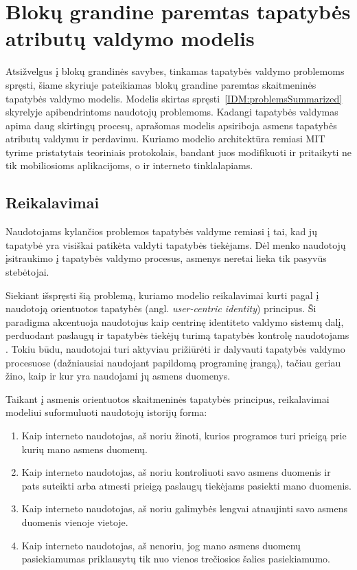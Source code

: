 \section{Blokų grandine paremtas tapatybės atributų valdymo modelis} \label{section:BCIDM}

Atsižvelgus į blokų grandinės savybes, tinkamas tapatybės valdymo problemoms spręsti, šiame skyriuje pateikiamas
blokų grandine paremtas skaitmeninės tapatybės valdymo modelis. Modelis skirtas spręsti\hypertarget{IDM:problemsSummarized}{~\ref{IDM:problemsSummarized}} skyrelyje
apibendrintoms naudotojų problemoms. Kadangi tapatybės valdymas apima
daug skirtingų procesų, aprašomas modelis apsiriboja asmens tapatybės atributų valdymu ir perdavimu. Kuriamo modelio architektūra 
remiasi MIT tyrime \cite{MITPaper} pristatytais teoriniais protokolais, bandant juos modifikuoti ir pritaikyti
ne tik mobiliosioms aplikacijoms, o ir interneto tinklalapiams.

\subsection{Reikalavimai} \label{BCIDM:requirements}

Naudotojams kylančios problemos tapatybės valdyme remiasi į tai, kad jų tapatybė yra
visiškai patikėta valdyti tapatybės tiekėjams. Dėl menko naudotojų įsitraukimo į tapatybės valdymo
procesus, asmenys neretai lieka tik pasyvūs stebėtojai.

Siekiant išspręsti šią problemą, kuriamo modelio reikalavimai kurti pagal į naudotoją orientuotos tapatybės
(angl. \textit{user-centric identity}) principus. Ši paradigma akcentuoja naudotojus kaip centrinę
identiteto valdymo sistemų dalį, perduodant paslaugų ir tapatybės tiekėjų turimą tapatybės kontrolę
naudotojams \cite{Cao2010}. Tokiu būdu, naudotojai turi aktyviau prižiūrėti ir dalyvauti tapatybės
valdymo procesuose (dažniausiai naudojant papildomą programinę įrangą),
tačiau geriau žino, kaip ir kur yra naudojami jų asmens duomenys.

Taikant į asmenis orientuotos skaitmeninės tapatybės principus, reikalavimai modeliui suformuluoti naudotojų istorijų forma:

\begin{enumerate}
    \item Kaip interneto naudotojas, aš noriu žinoti, kurios programos turi prieigą prie kurių mano asmens duomenų.
    \item Kaip interneto naudotojas, aš noriu kontroliuoti savo asmens duomenis ir pats suteikti arba atmesti prieigą paslaugų tiekėjams pasiekti mano duomenis.
    \item Kaip interneto naudotojas, aš noriu galimybės lengvai atnaujinti savo asmens duomenis vienoje vietoje.
    \item Kaip interneto naudotojas, aš nenoriu, jog mano asmens duomenų pasiekiamumas priklausytų tik nuo vienos trečiosios šalies pasiekiamumo.
\end{enumerate}

